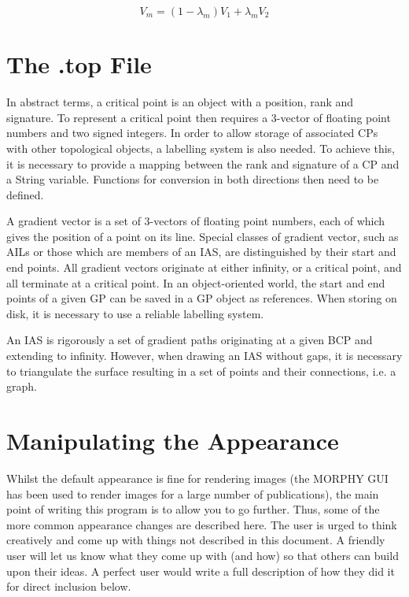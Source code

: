 \documentclass{report}
\begin{document}
\begin{equation}
V_{m} = (1 - \lambda_{m}) V_{1} + \lambda_{m} V_{2}
\end{equation}

\chapter{The .top File}

In abstract terms, a critical point is an object with a position, rank and signature.
To represent a critical point then requires a 3-vector of floating point numbers and two signed integers.
In order to allow storage of associated CPs with other topological objects, a labelling system is also needed.
To achieve this, it is necessary to provide a mapping between the rank and signature of a CP and a String variable.
Functions for conversion in both directions then need to be defined.

A gradient vector is a set of 3-vectors of floating point numbers, each of which gives the position of a point on its line.
Special classes of gradient vector, such as AILs or those which are members of an IAS, are distinguished by their start and end points.
All gradient vectors originate at either infinity, or a critical point, and all terminate at a critical point.
In an object-oriented world, the start and end points of a given GP can be saved in a GP object as references.
When storing on disk, it is necessary to use a reliable labelling system.

An IAS is rigorously a set of gradient paths originating at a given BCP and extending to infinity.
However, when drawing an IAS without gaps, it is necessary to triangulate the surface resulting in a set of points and their connections, i.e. a graph.

\chapter{Manipulating the Appearance}

Whilst the default appearance is fine for rendering images (the MORPHY GUI has been used to render images for 
a large number of publications), the main point of writing this program is to allow you to go further.
Thus, some of the more common appearance changes are described here. 
The user is urged to think creatively and come up with things not described in this document.
A friendly user will let us know what they come up with (and how) so that others can build upon their ideas.
A perfect user would write a full description of how they did it for direct inclusion below.
\end{document}
